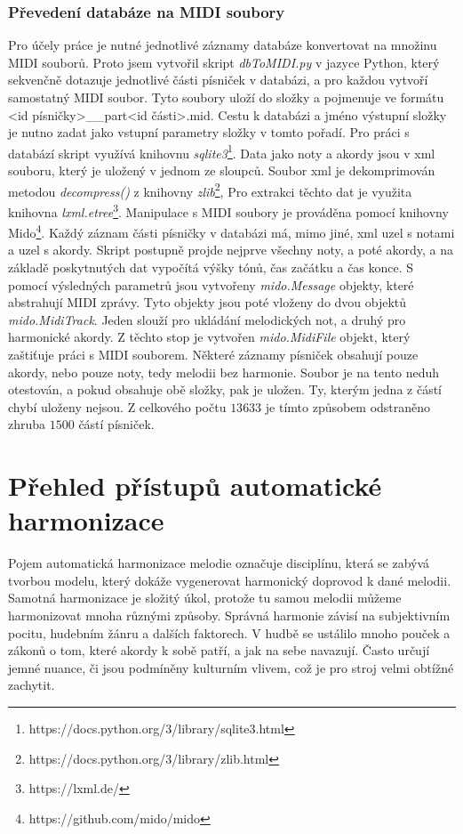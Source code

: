 \subsection{Převedení databáze na MIDI soubory}
Pro účely práce je nutné jednotlivé záznamy databáze
konvertovat na množinu MIDI souborů.
Proto jsem vytvořil skript \emph{dbToMIDI.py} v jazyce Python,
který sekvenčně dotazuje jednotlivé části písniček v databázi,
a pro každou vytvoří samostatný MIDI soubor.
Tyto soubory uloží do složky 
a pojmenuje ve formátu {<id písničky>\_\_part<id části>.mid}.
Cestu k databázi a jméno výstupní složky 
je nutno zadat jako vstupní parametry složky v tomto pořadí.
Pro práci s databází skript využívá knihovnu \emph{sqlite3}\footnote{https://docs.python.org/3/library/sqlite3.html}.
Data jako noty a akordy jsou v xml souboru, 
který je uložený v jednom ze sloupců.
Soubor xml je dekomprimován metodou \emph{decompress()} z knihovny \emph{zlib}\footnote{https://docs.python.org/3/library/zlib.html},
Pro extrakci těchto dat je využita knihovna \emph{lxml.etree}\footnote{https://lxml.de/}.
Manipulace s MIDI soubory je prováděna pomocí knihovny Mido\footnote{https://github.com/mido/mido}.
Každý záznam části písničky v databázi má, mimo jiné, 
xml uzel s notami a uzel s akordy.
Skript postupně projde nejprve všechny noty, a poté akordy,
a na základě poskytnutých dat vypočítá výšky tónů, čas začátku a čas konce.
S pomocí výsledných parametrů jsou vytvořeny \emph{mido.Message} objekty,
které abstrahují MIDI zprávy.
Tyto objekty jsou poté vloženy do dvou objektů \emph{mido.MidiTrack}.
Jeden slouží pro ukládání melodických not, a druhý pro harmonické akordy.
Z těchto stop je vytvořen \emph{mido.MidiFile} objekt, který zaštiťuje práci s MIDI souborem.
Některé záznamy písniček obsahují pouze akordy, nebo pouze noty, tedy melodii bez harmonie.
Soubor je na tento neduh otestován, a pokud obsahuje obě složky, pak je uložen.
Ty, kterým jedna z částí chybí uloženy nejsou.
Z celkového počtu $13 633$ je tímto způsobem odstraněno zhruba $1500$ částí písniček.

\chapter{Přehled přístupů automatické harmonizace}
\label{prehledPristupus}
Pojem automatická harmonizace melodie označuje disciplínu, která se zabývá tvorbou modelu, 
který dokáže vygenerovat harmonický doprovod k dané melodii.
Samotná harmonizace je složitý úkol, 
protože tu samou melodii můžeme harmonizovat mnoha různými způsoby.
Správná harmonie závisí na subjektivním pocitu, hudebním žánru a dalších faktorech.
V hudbě se ustálilo mnoho pouček a zákonů o tom, které akordy k sobě patří,
a jak na sebe navazují.
Často určují jemné nuance, či jsou podmíněny kulturním vlivem, 
což je pro stroj velmi obtížné zachytit.
\cite{YinCheng_comparativeStudy}
\par

